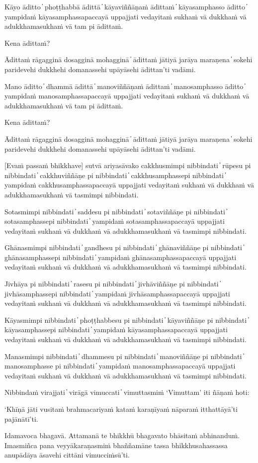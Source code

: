 Kāyo āditto  ̓  phoṭṭhabbā ādittā  ̓  kāyaviññāṇaṁ ādittaṁ  ̓  kāyasamphasso āditto  ̓  yampidaṁ kāyasamphassapaccayā uppajjati vedayitaṁ sukhaṁ vā dukkhaṁ vā adukkhamasukhaṁ vā tam pi ādittaṁ.

Kena ādittaṁ?

Ādittaṁ rāgagginā dosagginā mohagginā  ̓  ādittaṁ jātiyā jarāya maraṇena  ̓  sokehi paridevehi dukkhehi domanassehi upāyāsehi ādittan’ti vadāmi.

Mano āditto  ̓  dhammā ādittā  ̓  manoviññāṇaṁ ādittaṁ  ̓  manosamphasso āditto  ̓  yampidaṁ manosamphassapaccayā uppajjati vedayitaṁ sukhaṁ vā dukkhaṁ vā adukkhamasukhaṁ vā tam pi ādittaṁ.

Kena ādittaṁ?

Ādittaṁ rāgagginā dosagginā mohagginā  ̓  ādittaṁ jātiyā jarāya maraṇena  ̓  sokehi paridevehi dukkhehi domanassehi upāyāsehi ādittan’ti vadāmi.

[Evaṁ passaṁ bhikkhave] sutvā ariyasāvako cakkhusmimpi nibbindati  ̓  rūpesu pi nibbindati  ̓  cakkhuviññāṇe pi nibbindati  ̓  cakkhusamphassepi nibbindati  ̓  yampidaṁ cakkhusamphassapaccayā uppajjati vedayitaṁ sukhaṁ vā dukkhaṁ vā adukkhamasukhaṁ vā tasmimpi nibbindati.

Sotasmimpi nibbindati  ̓  saddesu pi nibbindati  ̓  sotaviññāṇe pi nibbindati  ̓  sotasamphassepi nibbindati  ̓  yampidaṁ sotasamphassapaccayā uppajjati vedayitaṁ sukhaṁ vā dukkhaṁ vā adukkhamasukhaṁ vā tasmimpi nibbindati.

Ghānasmimpi nibbindati  ̓  gandhesu pi nibbindati  ̓  ghānaviññāṇe pi nibbindati  ̓  ghānasamphassepi nibbindati  ̓  yampidaṁ ghānasamphassapaccayā uppajjati vedayitaṁ sukhaṁ vā dukkhaṁ vā adukkhamasukhaṁ vā tasmimpi nibbindati.

Jivhāya pi nibbindati  ̓  rasesu pi nibbindati  ̓  jivhāviññāṇe pi nibbindati  ̓  jivhāsamphassepi nibbindati  ̓  yampidaṁ jivhāsamphassapaccayā uppajjati vedayitaṁ sukhaṁ vā dukkhaṁ vā adukkhamasukhaṁ vā tasmimpi nibbindati.

Kāyasmimpi nibbindati  ̓  phoṭṭhabbesu pi nibbindati  ̓  kāyaviññāṇe pi nibbindati  ̓  kāyasamphassepi nibbindati  ̓  yampidaṁ kāyasamphassapaccayā uppajjati vedayitaṁ sukhaṁ vā dukkhaṁ vā adukkhamasukhaṁ vā tasmimpi nibbindati.

Manasmimpi nibbindati  ̓  dhammesu pi nibbindati  ̓  manoviññāṇe pi nibbindati  ̓  manosamphasse pi nibbindati  ̓  yampidaṁ manosamphassapaccayā uppajjati vedayitaṁ sukhaṁ vā dukkhaṁ vā adukkhamasukhaṁ vā tasmimpi nibbindati.

Nibbindaṁ virajjati  ̓  virāgā vimuccati  ̓  vimuttasmiṁ ‘Vimuttam’ iti ñāṇaṁ hoti:

‘Khīṇā jāti vusitaṁ brahmacariyaṁ kataṁ karaṇīyaṁ nāparaṁ itthattāyā’ti pajānātī’ti.

Idamavoca bhagavā. Attamanā te bhikkhū bhagavato bhāsitaṁ abhinanduṁ. Imasmiñca pana veyyākaraṇasmiṁ bhaññamāne tassa bhikkhusahassassa anupādāya āsavehi cittāni vimucciṁsū’ti.

\suttaRef{[SN 35.28]}
